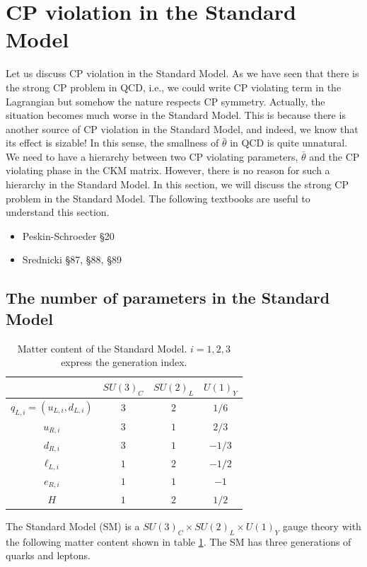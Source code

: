 \documentclass[11pt,a4paper]{article}
\begin{document}
\section{CP violation in the Standard Model}\label{sec:cpv sm}
Let us discuss CP violation in the Standard Model. As we have seen that there is the strong CP problem in QCD, i.e., we could write CP violating term in the Lagrangian but somehow the nature respects CP symmetry.
Actually, the situation becomes much worse in the Standard Model. This is because there is another source of CP violation in the Standard Model, and indeed, we know that its effect is sizable! In this sense, the smallness of $\bar\theta$ in QCD is quite unnatural. We need to have a hierarchy between two CP violating parameters, $\bar\theta$ and the CP violating phase in the CKM matrix. However, there is no reason for such a hierarchy in the Standard Model. In this section, we will discuss the strong CP problem in the Standard Model.
The following textbooks are useful to understand this section.
\begin{itemize}
\item Peskin-Schroeder \cite{Peskin:1995ev} \S 20
\item Srednicki \cite{Srednicki:2007qs} \S 87, \S 88, \S 89
\end{itemize}


\subsection{The number of parameters in the Standard Model}
\begin{table}
\centering
\begin{tabular}{c|ccc}
& $SU(3)_C$ & $SU(2)_L$ & $U(1)_Y$ \\\hline
$q_{L,i} = (u_{L,i}, d_{L,i})$ & $3$ & $2$ & $1/6$ \\
$u_{R,i}$ & $3$ & $1$ & $2/3$ \\
$d_{R,i}$ & $3$ & $1$ & $-1/3$ \\
$\ell_{L,i}$ & $1$ & $2$ & $-1/2$ \\
$e_{R,i}$ & $1$ & $1$ & $-1$ \\\hline
$H$ & $1$ & $2$ & $1/2$
\end{tabular}
\caption{Matter content of the Standard Model. $i=1,2,3$ express the generation index.} \label{tab:SM matter content}
\end{table}
%
The Standard Model (SM) is a $SU(3)_C \times SU(2)_L \times U(1)_Y$ gauge theory with the following matter content shown in table \ref{tab:SM matter content}.
The SM has three generations of quarks and leptons.
\end{document}
